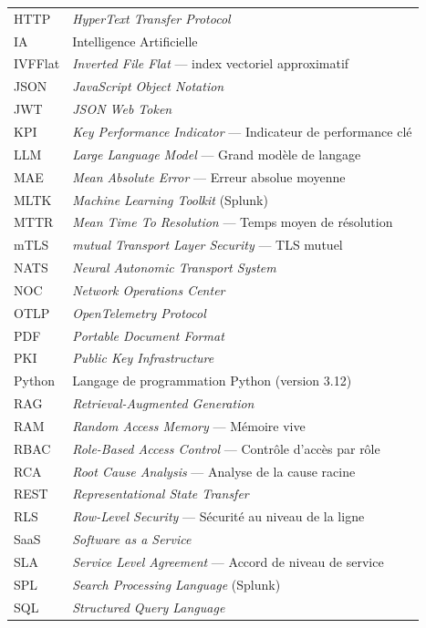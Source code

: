 \begin{longtable}{@{}lp{11cm}@{}}
HTTP  & \textit{HyperText Transfer Protocol} \\
IA    & Intelligence Artificielle \\
IVFFlat & \textit{Inverted File Flat} — index vectoriel approximatif \\
JSON  & \textit{JavaScript Object Notation} \\
JWT   & \textit{JSON Web Token} \\
KPI   & \textit{Key Performance Indicator} — Indicateur de performance clé \\
LLM   & \textit{Large Language Model} — Grand modèle de langage \\
MAE   & \textit{Mean Absolute Error} — Erreur absolue moyenne \\
MLTK  & \textit{Machine Learning Toolkit} (Splunk) \\
MTTR  & \textit{Mean Time To Resolution} — Temps moyen de résolution \\
mTLS  & \textit{mutual Transport Layer Security} — TLS mutuel \\
NATS  & \textit{Neural Autonomic Transport System} \\
NOC   & \textit{Network Operations Center} \\
OTLP  & \textit{OpenTelemetry Protocol} \\
PDF   & \textit{Portable Document Format} \\
PKI   & \textit{Public Key Infrastructure} \\
Python & Langage de programmation Python (version 3.12) \\
RAG   & \textit{Retrieval-Augmented Generation} \\
RAM   & \textit{Random Access Memory} — Mémoire vive \\
RBAC  & \textit{Role-Based Access Control} — Contrôle d'accès par rôle \\
RCA   & \textit{Root Cause Analysis} — Analyse de la cause racine \\
REST  & \textit{Representational State Transfer} \\
RLS   & \textit{Row-Level Security} — Sécurité au niveau de la ligne \\
SaaS  & \textit{Software as a Service} \\
SLA   & \textit{Service Level Agreement} — Accord de niveau de service \\
SPL   & \textit{Search Processing Language} (Splunk) \\
SQL   & \textit{Structured Query Language} \\

\end{longtable}
